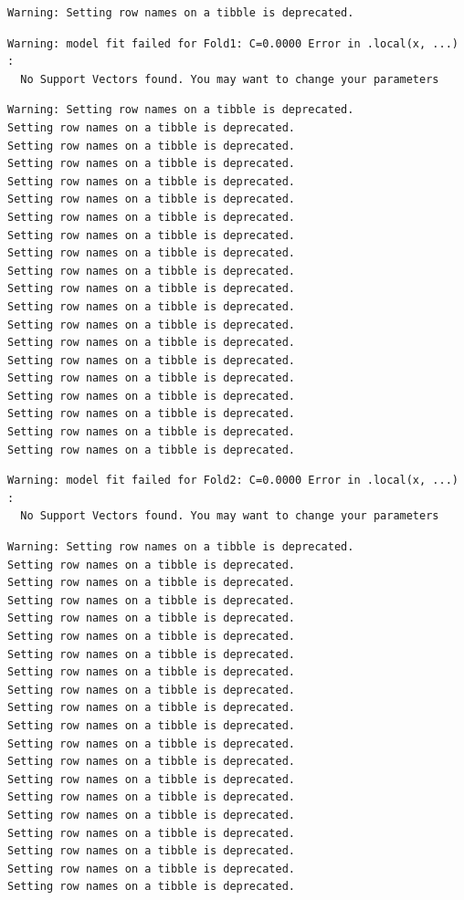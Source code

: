 \documentclass[
  letterpaper,
  DIV=11,
  numbers=noendperiod]{scrartcl}
\begin{document}
\begin{verbatim}
Warning: Setting row names on a tibble is deprecated.
\end{verbatim}

\begin{verbatim}
Warning: model fit failed for Fold1: C=0.0000 Error in .local(x, ...) : 
  No Support Vectors found. You may want to change your parameters
\end{verbatim}

\begin{verbatim}
Warning: Setting row names on a tibble is deprecated.
Setting row names on a tibble is deprecated.
Setting row names on a tibble is deprecated.
Setting row names on a tibble is deprecated.
Setting row names on a tibble is deprecated.
Setting row names on a tibble is deprecated.
Setting row names on a tibble is deprecated.
Setting row names on a tibble is deprecated.
Setting row names on a tibble is deprecated.
Setting row names on a tibble is deprecated.
Setting row names on a tibble is deprecated.
Setting row names on a tibble is deprecated.
Setting row names on a tibble is deprecated.
Setting row names on a tibble is deprecated.
Setting row names on a tibble is deprecated.
Setting row names on a tibble is deprecated.
Setting row names on a tibble is deprecated.
Setting row names on a tibble is deprecated.
Setting row names on a tibble is deprecated.
Setting row names on a tibble is deprecated.
\end{verbatim}

\begin{verbatim}
Warning: model fit failed for Fold2: C=0.0000 Error in .local(x, ...) : 
  No Support Vectors found. You may want to change your parameters
\end{verbatim}

\begin{verbatim}
Warning: Setting row names on a tibble is deprecated.
Setting row names on a tibble is deprecated.
Setting row names on a tibble is deprecated.
Setting row names on a tibble is deprecated.
Setting row names on a tibble is deprecated.
Setting row names on a tibble is deprecated.
Setting row names on a tibble is deprecated.
Setting row names on a tibble is deprecated.
Setting row names on a tibble is deprecated.
Setting row names on a tibble is deprecated.
Setting row names on a tibble is deprecated.
Setting row names on a tibble is deprecated.
Setting row names on a tibble is deprecated.
Setting row names on a tibble is deprecated.
Setting row names on a tibble is deprecated.
Setting row names on a tibble is deprecated.
Setting row names on a tibble is deprecated.
Setting row names on a tibble is deprecated.
Setting row names on a tibble is deprecated.
Setting row names on a tibble is deprecated.
\end{verbatim}
\end{document}
